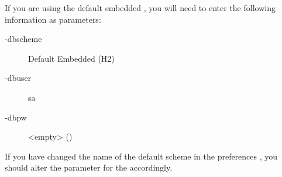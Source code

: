 
If you are using the default embedded \gddb{}, you will need to enter the following information as parameters:
\begin{description}
\item[-dbscheme]{Default Embedded (H2)}
\item[-dbuser]{sa}
\item[-dbpw]{<empty> ()}

\end{description}
If you have changed the name of the default \gddb{} scheme in the \gddb{} preferences , you should alter the parameter for the  accordingly. 
